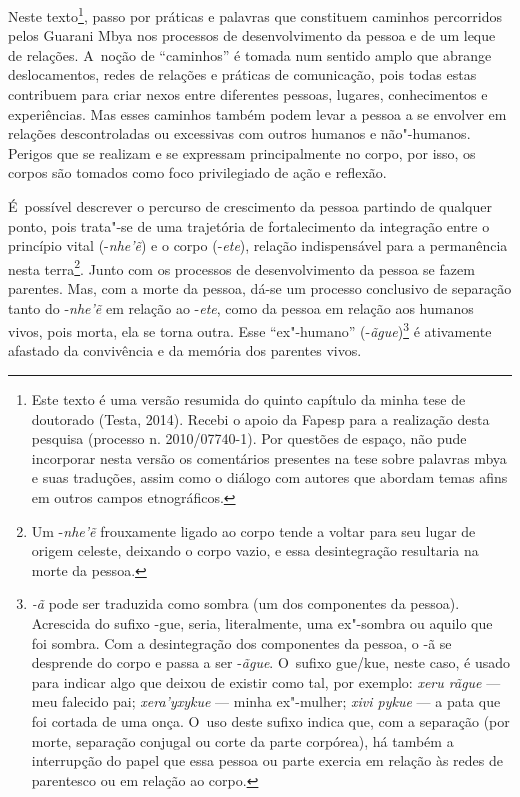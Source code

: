\noindent
Neste texto\footnote{Este texto é uma versão resumida do quinto capítulo
da minha tese de doutorado (Testa, 2014). Recebi o apoio da Fapesp para
a realização desta pesquisa (processo n. 2010/07740-1). Por questões de
espaço, não pude incorporar nesta versão os comentários presentes na
tese sobre palavras mbya e suas traduções, assim como o diálogo com
autores que abordam temas afins em outros campos etnográficos.}, passo
por práticas e palavras que constituem caminhos percorridos pelos
Guarani Mbya nos processos de desenvolvimento da pessoa e de um leque
de relações. A~noção de ``caminhos'' é tomada num sentido amplo que abrange
deslocamentos, redes de relações e práticas de comunicação, pois todas
estas contribuem para criar nexos entre diferentes pessoas, lugares,
conhecimentos e experiências. Mas esses caminhos também podem levar a
pessoa a se envolver em relações descontroladas ou excessivas com
outros humanos e não"-humanos. Perigos que se realizam e se expressam
principalmente no corpo, por isso, os corpos são tomados como foco
privilegiado de ação e reflexão.

É~possível descrever o percurso de crescimento da pessoa partindo de
qualquer ponto, pois trata"-se de uma trajetória de fortalecimento da
integração entre o princípio vital (-\emph{nhe’ẽ}) e o corpo (-\emph{ete}),
relação indispensável para a permanência nesta terra\footnote{Um
-\emph{nhe’ẽ} frouxamente ligado ao corpo tende a voltar para seu lugar
de origem celeste, deixando o corpo vazio, e essa desintegração
resultaria na morte da pessoa.}. Junto com os processos de
desenvolvimento da pessoa se fazem parentes. Mas, com a morte da
pessoa, dá-se um processo conclusivo de separação tanto do -\emph{nhe’ẽ}
em relação ao -\emph{ete}, como da pessoa em relação aos humanos vivos, pois
morta, ela se torna outra. Esse ``ex"-humano'' (-\emph{ãgue})\footnote{\emph{-ã} pode
ser traduzida como sombra (um dos componentes da pessoa). Acrescida do
sufixo -gue, seria, literalmente, uma ex"-sombra ou aquilo que foi
sombra. Com a desintegração dos componentes da pessoa, o -ã se
desprende do corpo e passa a ser -\emph{ãgue}. O~sufixo gue/kue, neste caso, é
usado para indicar algo que deixou de existir como tal, por exemplo:
\emph{xeru rãgue} --- meu falecido pai; \emph{xera’yxykue} --- minha ex"-mulher; \emph{xivi
pykue} --- a pata que foi cortada de uma onça. O~uso deste sufixo indica
que, com a separação (por morte, separação conjugal ou corte da parte
corpórea), há também a interrupção do papel que essa pessoa ou parte
exercia em relação às redes de parentesco ou em relação ao corpo.} é
ativamente afastado da convivência e da memória dos parentes vivos. 

